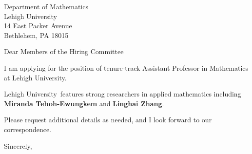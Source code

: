 




	
	
	\def\School{Lehigh University}
	
	\begin{letter}
		{Department of Mathematics\\
			Lehigh University\\
			14 East Packer Avenue\\
			Bethlehem, PA 18015
			
		}
		
		\opening{Dear Members of the Hiring Committee}
		
		
		I am applying for the position of tenure-track Assistant Professor in Mathematics  at \School. 
		
		\School~features strong researchers in applied mathematics including \textbf{Miranda Teboh-Ewungkem} and \textbf{Linghai Zhang}.  
		
		
		
		
		
		Please request additional details as needed, and I look forward to our correspondence.
		
		\closing{Sincerely,}
	\end{letter}
